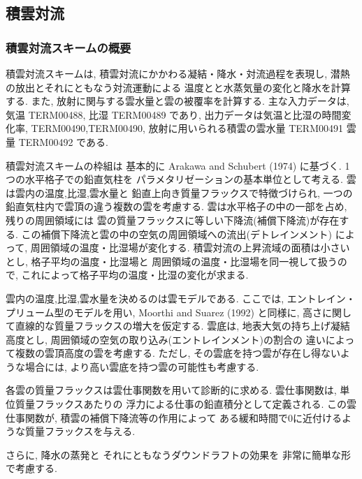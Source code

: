 ﻿
\subsection{積雲対流}

\subsubsection{積雲対流スキームの概要}

積雲対流スキームは,
積雲対流にかかわる凝結・降水・対流過程を表現し,
潜熱の放出とそれにともなう対流運動による
温度とと水蒸気量の変化と降水を計算する.
また, 放射に関与する雲水量と雲の被覆率を計算する.
主な入力データは, 気温 TERM00488, 比湿 TERM00489 であり,
出力データは気温と比湿の時間変化率,
TERM00490,TERM00490,
放射に用いられる積雲の雲水量 TERM00491 雲量 TERM00492 である.

積雲対流スキームの枠組は
基本的に Arakawa and Schubert (1974) に基づく.
1つの水平格子での鉛直気柱を
パラメタリゼーションの基本単位として考える.
雲は雲内の温度,比湿,雲水量と
鉛直上向き質量フラックスで特徴づけられ,
一つの鉛直気柱内で雲頂の違う複数の雲を考慮する.
雲は水平格子の中の一部を占め, 残りの周囲領域には
雲の質量フラックスに等しい下降流(補償下降流)が存在する.
この補償下降流と雲の中の空気の周囲領域への流出(デトレインメント)
によって, 周囲領域の温度・比湿場が変化する.
積雲対流の上昇流域の面積は小さいとし,
格子平均の温度・比湿場と
周囲領域の温度・比湿場を同一視して扱うので,
これによって格子平均の温度・比湿の変化が求まる.

雲内の温度,比湿,雲水量を決めるのは雲モデルである.
ここでは, エントレイン・プリューム型のモデルを用い,
Moorthi and Suarez (1992) と同様に,
高さに関して直線的な質量フラックスの増大を仮定する.
雲底は, 地表大気の持ち上げ凝結高度とし,
周囲領域の空気の取り込み(エントレインメント)の割合の
違いによって複数の雲頂高度の雲を考慮する.
ただし, その雲底を持つ雲が存在し得ないような場合には,
より高い雲底を持つ雲の可能性も考慮する.

各雲の質量フラックスは雲仕事関数を用いて診断的に求める.
雲仕事関数は, 単位質量フラックスあたりの
浮力による仕事の鉛直積分として定義される.
この雲仕事関数が, 積雲の補償下降流等の作用によって
ある緩和時間で0に近付けるような質量フラックスを与える.

さらに, 降水の蒸発と
それにともなうダウンドラフトの効果を
非常に簡単な形で考慮する.

